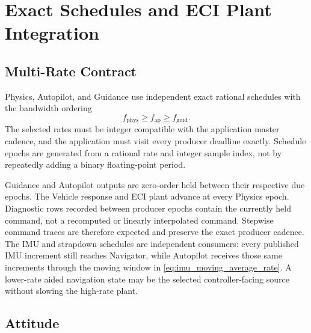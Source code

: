 \chapter{Exact Schedules and ECI Plant Integration}

\section{Multi-Rate Contract}

Physics, Autopilot, and Guidance use independent exact rational schedules with
the bandwidth ordering
\begin{equation}
f_{\mathrm{phys}}
\geq
f_{\mathrm{ap}}
\geq
f_{\mathrm{guid}}.
\label{eq:trajectory_rate_order}
\end{equation}
The selected rates must be integer compatible with the application master
cadence, and the application must visit every producer deadline exactly.
Schedule epochs are generated from a rational rate and integer sample index,
not by repeatedly adding a binary floating-point period.

Guidance and Autopilot outputs are zero-order held between their respective
due epochs. The Vehicle response and ECI plant advance at every Physics epoch.
Diagnostic rows recorded between producer epochs contain the currently held
command, not a recomputed or linearly interpolated command. Stepwise command
traces are therefore expected and preserve the exact producer cadence.
The IMU and strapdown schedules are independent consumers: every published IMU
increment still reaches Navigator, while Autopilot receives those same
increments through the moving window in
\cref{eq:imu_moving_average_rate}. A lower-rate aided navigation state may be
the selected controller-facing source without slowing the high-rate plant.

\section{Attitude}

